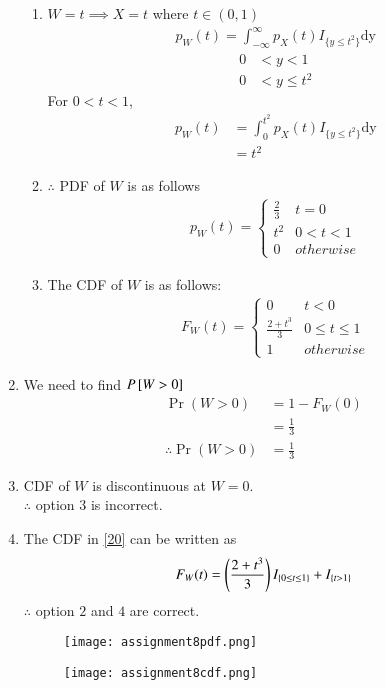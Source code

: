 \documentclass[journal,12pt,twocolumn]{IEEEtran}
\begin{document}
\begin{enumerate}
\begin{enumerate}
\item $W=t \implies X=t $ where $t \in (0,1)$
\begin{align}
p_{W}(t) = \int_{- \infty}^{\infty} p_X(t)I_{\{y\leq t^2\}} \mathrm{dy}
\end{align}
\begin{align}
   0 &< y < 1 \label{16} \\
   0 &< y \leq t^2  \label{17}
\end{align}
For $ 0 < t < 1 $,
\begin{align}
p_W(t) &= \int_{0}^{t^2} p_X(t)I_{\{y\leq t^2\}} \mathrm{dy} \\
       &= t^2 \label{18}
\end{align}
\item $\therefore$ PDF of $W$ is as follows
\begin{align}
p_{W}(t)  = 
\begin{cases}
  \frac{2}{3}& t=0 \\
  t^2 & 0 < t < 1 \\
  0 & otherwise
\end{cases} \label{19}
\end{align}
\item The CDF  of $W$ is as follows:
\begin{align}
F_W(t)  = 
\begin{cases}
  0 & t<0 \\
  \frac{2+t^3}{3}& 0 \leq t\leq 1\\
  1 & otherwise
\end{cases} \label{20}
\end{align}
\end{enumerate}
\item We need to find $P{}\left[W>0\right]$
\begin{align}
\Pr(W > 0)&= 1- F_W(0) \\
           &=\frac{1}{3} \label{21} \\
\therefore \Pr(W>0)&=\frac{1}{3}
\end{align}
\item CDF of $W$ is discontinuous at $W=0$.\\
$\therefore$ option $3$ is incorrect.\\
\item The CDF in \eqref{20} can be written as
\begin{align}
  F_W(t)=\left(\frac{2+t^3}{3}\right)I_{\{0\leq t \leq 1\}}+ I_{\{t > 1\}}
\end{align}
$\therefore$ option $2$ and $4$ are correct.
\begin{figure}[htb!]
\begin{center}
\texttt{[image: assignment8pdf.png]}
\end{center}
\end{figure}

\begin{figure}[htb!]
\begin{center}
\texttt{[image: assignment8cdf.png]}
\end{center}
\end{figure}
\end{enumerate}
\end{document}
